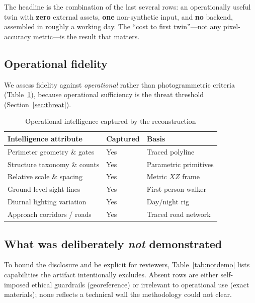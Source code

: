 \documentclass[conference]{IEEEtran}
\begin{document}
The headline is the combination of the last several rows: an operationally useful
twin with \textbf{zero} external assets, \textbf{one} non-synthetic input, and
\textbf{no} backend, assembled in roughly a working day. The ``cost to first
twin''---not any pixel-accuracy metric---is the result that matters.

\subsection{Operational fidelity}
We assess fidelity against \emph{operational} rather than photogrammetric criteria
(Table~\ref{tab:fidelity}), because operational sufficiency is the threat
threshold (Section~\ref{sec:threat}).

\begin{table}[t]
\caption{Operational intelligence captured by the reconstruction}
\label{tab:fidelity}
\centering
\begin{tabular}{@{}lll@{}}
\toprule
\textbf{Intelligence attribute} & \textbf{Captured} & \textbf{Basis} \\
\midrule
Perimeter geometry \& gates   & Yes  & Traced polyline \\
Structure taxonomy \& counts  & Yes  & Parametric primitives \\
Relative scale \& spacing     & Yes  & Metric $XZ$ frame \\
Ground-level sight lines      & Yes  & First-person walker \\
Diurnal lighting variation    & Yes  & Day/night rig \\
Approach corridors / roads    & Yes  & Traced road network \\
\bottomrule
\end{tabular}
\end{table}

\subsection{What was deliberately \emph{not} demonstrated}
To bound the disclosure and be explicit for reviewers, Table~\ref{tab:notdemo}
lists capabilities the artifact intentionally excludes. Absent rows are either
self-imposed ethical guardrails (georeference) or irrelevant to operational use
(exact materials); none reflects a technical wall the methodology could not clear.
\end{document}
